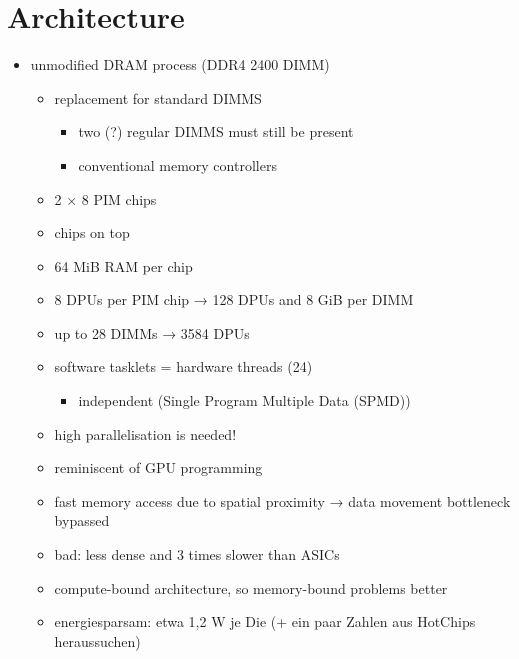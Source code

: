 \section{Architecture}
\label{sec:prereq:arch}

\begin{itemize}
	\item
	unmodified DRAM process (DDR4 2400 DIMM)
	\begin{itemize}
		\item
		replacement for standard DIMMS
		\begin{itemize}
			\item
			two (?) regular DIMMS must still be present

			\item
			conventional memory controllers
		\end{itemize}

		\item
		2 × 8 PIM chips

		\item
		chips on top

		\item
		64 MiB RAM per chip

		\item
		8 DPUs per PIM chip → 128 DPUs and 8 GiB per DIMM

		\item
		up to 28 DIMMs → 3584 DPUs

		\item
		software tasklets = hardware threads (24)
		\begin{itemize}
			\item
			independent (Single Program Multiple Data (SPMD))
		\end{itemize}

		\item
		high parallelisation is needed!

		\item
		reminiscent of GPU programming

		\item
		fast memory access due to spatial proximity → data movement bottleneck bypassed

		\item
		bad:
		less dense and 3 times slower than ASICs

		\item
		compute-bound architecture, so memory-bound problems better

		\item
		energiesparsam:
		etwa 1,2 W je Die
		(+ ein paar Zahlen aus HotChips heraussuchen)
	\end{itemize}


\end{itemize}
